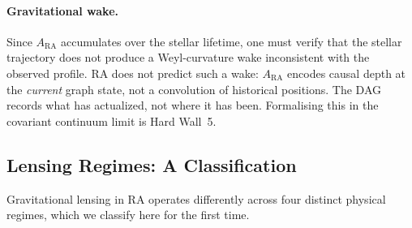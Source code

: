 \documentclass[11pt,a4paper]{article}
\theoremstyle{plain}
\theoremstyle{definition}
\theoremstyle{remark}
\begin{document}
\paragraph{Gravitational wake.}
Since $A_{\mathrm{RA}}$ accumulates over the stellar lifetime, one must verify
that the stellar trajectory does not produce a Weyl-curvature wake inconsistent
with the observed profile. RA does not predict such a wake: $A_{\mathrm{RA}}$
encodes causal depth at the \emph{current} graph state, not a convolution of
historical positions. The DAG records what has actualized, not where it has been.
Formalising this in the covariant continuum limit is Hard Wall~5.

\subsection{Lensing Regimes: A Classification}
\label{sec:lensing_regimes}

Gravitational lensing in RA operates differently across four distinct
physical regimes, which we classify here for the first time.
\end{document}
